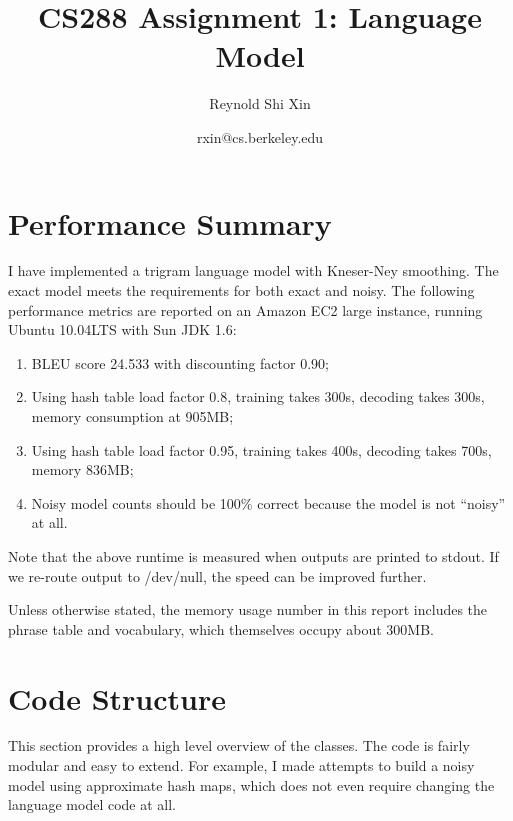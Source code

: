 \documentclass[12pt]{article}   %
\begin{document}
\title{CS288 Assignment 1: Language Model}   %
\author{Reynold Shi Xin}         %
\date{rxin@cs.berkeley.edu}    %
\maketitle

\section{Performance Summary}
I have implemented a trigram language model with Kneser-Ney smoothing. The exact model meets the requirements for both exact and noisy. The following performance metrics are reported on an Amazon EC2 large instance, running Ubuntu 10.04LTS with Sun JDK 1.6:
\begin{enumerate}
	\item BLEU score 24.533 with discounting factor 0.90;
	\item Using hash table load factor 0.8, training takes 300s, decoding takes 300s, memory consumption at 905MB;
	\item Using hash table load factor 0.95, training takes 400s, decoding takes 700s, memory 836MB;
	\item Noisy model counts should be 100\% correct because the model is not ``noisy'' at all.
\end{enumerate}

Note that the above runtime is measured when outputs are printed to stdout. If we re-route output to /dev/null, the speed can be improved further.

Unless otherwise stated, the memory usage number in this report includes the phrase table and vocabulary, which themselves occupy about 300MB.

\section{Code Structure}
This section provides a high level overview of the classes. The code is fairly modular and easy to extend. For example, I made attempts to build a noisy model using approximate hash maps, which does not even require changing the language model code at all.
\end{document}
